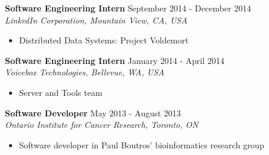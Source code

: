\documentclass[10pt]{res} %
\begin{document}
\textbf{Software Engineering Intern} \hfill September 2014 - December 2014 \\[2pt]
{\sl LinkedIn Corporation, Mountain View, CA, USA} 
\begin{itemize}  %
    \item Distributed Data Systems: Project Voldemort
\end{itemize}
 
\textbf{Software Engineering Intern} \hfill January 2014 - April 2014 \\[2pt]
{\sl Voicebox Technologies, Bellevue, WA, USA} 
\begin{itemize}  %
    \item Server and Tools team
\end{itemize}

\textbf{Software Developer} \hfill May 2013 - August 2013 \\[2pt]
{\sl Ontario Institute for Cancer Research, Toronto, ON} 
\begin{itemize}  %
    \item Software developer in Paul Boutros' bioinformatics research group
\end{itemize}
\end{document}
